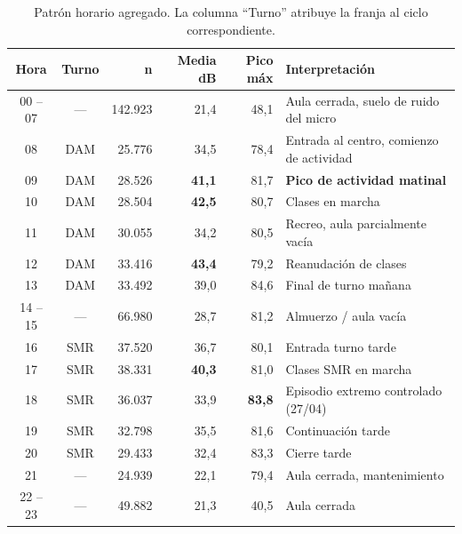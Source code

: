 \documentclass[11pt,a4paper,openany]{report}
\begin{document}
\begin{table}[H]
\centering
\footnotesize
{}
\begin{tabularx}{\textwidth}{c c r r r X}
\toprule
\rowcolor{TableHead}
\textbf{Hora} & \textbf{Turno} & \textbf{n} & \textbf{Media dB} & \textbf{Pico m\'ax} & \textbf{Interpretaci\'on} \\ \midrule
00 -- 07 & ---       & 142.923 & 21,4 & 48,1 & Aula cerrada, suelo de ruido del micro \\
08       & DAM       &  25.776 & 34,5 & 78,4 & Entrada al centro, comienzo de actividad \\
09       & DAM       &  28.526 & \textbf{41,1} & 81,7 & \textbf{Pico de actividad matinal} \\
10       & DAM       &  28.504 & \textbf{42,5} & 80,7 & Clases en marcha \\
11       & DAM       &  30.055 & 34,2 & 80,5 & Recreo, aula parcialmente vac\'ia \\
12       & DAM       &  33.416 & \textbf{43,4} & 79,2 & Reanudaci\'on de clases \\
13       & DAM       &  33.492 & 39,0 & 84,6 & Final de turno ma\~nana \\
14 -- 15 & ---       &  66.980 & 28,7 & 81,2 & Almuerzo / aula vac\'ia \\
16       & SMR       &  37.520 & 36,7 & 80,1 & Entrada turno tarde \\
17       & SMR       &  38.331 & \textbf{40,3} & 81,0 & Clases SMR en marcha \\
18       & SMR       &  36.037 & 33,9 & \textbf{83,8} & Episodio extremo controlado (27/04) \\
19       & SMR       &  32.798 & 35,5 & 81,6 & Continuaci\'on tarde \\
20       & SMR       &  29.433 & 32,4 & 83,3 & Cierre tarde \\
21       & ---       &  24.939 & 22,1 & 79,4 & Aula cerrada, mantenimiento \\
22 -- 23 & ---       &  49.882 & 21,3 & 40,5 & Aula cerrada \\ \bottomrule
\end{tabularx}
\caption{Patr\'on horario agregado. La columna ``Turno'' atribuye la franja al ciclo correspondiente.}
\label{tab:por-hora}
\end{table}
\end{document}
